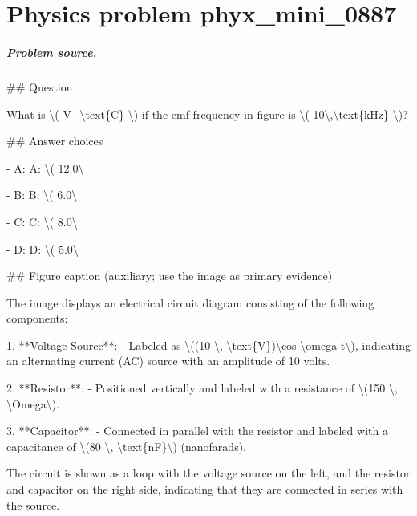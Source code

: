 
\chapter{Physics problem phyx\_mini\_0887}
\label{ch:PhyXMiniProblems_problem_phyx_mini_0887}

\paragraph{Problem source.}
\#\# Question

What is \textbackslash{}( V\_\textbackslash{}text\{C\} \textbackslash{}) if the emf frequency in figure is \textbackslash{}( 10\textbackslash{},\textbackslash{}text\{kHz\} \textbackslash{})?

\#\# Answer choices

- A: A: \textbackslash{}( 12.0\textbackslash{}

- B: B: \textbackslash{}( 6.0\textbackslash{}

- C: C: \textbackslash{}( 8.0\textbackslash{}

- D: D: \textbackslash{}( 5.0\textbackslash{}

\#\# Figure caption (auxiliary; use the image as primary evidence)

The image displays an electrical circuit diagram consisting of the following components:

1. **Voltage Source**: 
   - Labeled as \textbackslash{}((10 \textbackslash{}, \textbackslash{}text\{V\})\textbackslash{}cos \textbackslash{}omega t\textbackslash{}), indicating an alternating current (AC) source with an amplitude of 10 volts.

2. **Resistor**:
   - Positioned vertically and labeled with a resistance of \textbackslash{}(150 \textbackslash{}, \textbackslash{}Omega\textbackslash{}).

3. **Capacitor**:
   - Connected in parallel with the resistor and labeled with a capacitance of \textbackslash{}(80 \textbackslash{}, \textbackslash{}text\{nF\}\textbackslash{}) (nanofarads).

The circuit is shown as a loop with the voltage source on the left, and the resistor and capacitor on the right side, indicating that they are connected in series with the source.


